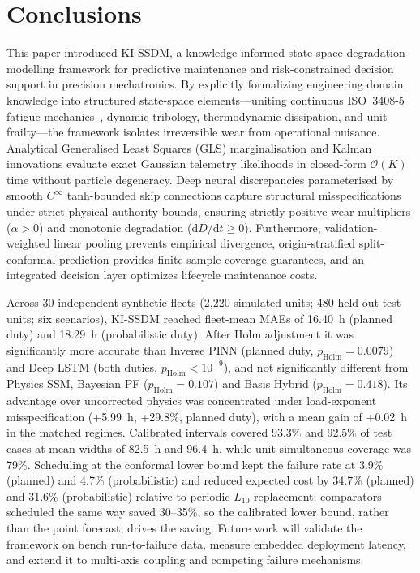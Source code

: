 \documentclass[a4paper,fleqn]{cas-dc}
\begin{document}
\section{Conclusions}
\label{sec:conclusions}

This paper introduced KI-SSDM, a knowledge-informed state-space degradation modelling framework for predictive maintenance and risk-constrained decision support in precision mechatronics. By explicitly formalizing engineering domain knowledge into structured state-space elements---uniting continuous ISO~3408-5 fatigue mechanics~\cite{ISO_3408_5}, dynamic tribology, thermodynamic dissipation, and unit frailty---the framework isolates irreversible wear from operational nuisance. Analytical Generalised Least Squares (GLS) marginalisation and Kalman innovations evaluate exact Gaussian telemetry likelihoods in closed-form $\mathcal{O}(K)$ time without particle degeneracy. Deep neural discrepancies parameterised by smooth $C^\infty$ tanh-bounded skip connections capture structural misspecifications under strict physical authority bounds, ensuring strictly positive wear multipliers ($\alpha > 0$) and monotonic degradation ($\mathrm{d}D/\mathrm{d}t \ge 0$). Furthermore, validation-weighted linear pooling prevents empirical divergence, origin-stratified split-conformal prediction provides finite-sample coverage guarantees, and an integrated decision layer optimizes lifecycle maintenance costs.

Across 30 independent synthetic fleets (2,220 simulated units; 480 held-out test units; six scenarios), KI-SSDM reached fleet-mean MAEs of 16.40~h (planned duty) and 18.29~h (probabilistic duty). After Holm adjustment it was significantly more accurate than Inverse PINN (planned duty, $p_{\mathrm{Holm}} = 0.0079$) and Deep LSTM (both duties, $p_{\mathrm{Holm}} < 10^{-9}$), and not significantly different from Physics SSM, Bayesian PF ($p_{\mathrm{Holm}} = 0.107$) and Basis Hybrid ($p_{\mathrm{Holm}} = 0.418$). Its advantage over uncorrected physics was concentrated under load-exponent misspecification (+5.99~h, +29.8\%, planned duty), with a mean gain of +0.02~h in the matched regimes. Calibrated intervals covered 93.3\% and 92.5\% of test cases at mean widths of 82.5~h and 96.4~h, while unit-simultaneous coverage was 79\%. Scheduling at the conformal lower bound kept the failure rate at 3.9\% (planned) and 4.7\% (probabilistic) and reduced expected cost by 34.7\% (planned) and 31.6\% (probabilistic) relative to periodic $L_{10}$ replacement; comparators scheduled the same way saved 30--35\%, so the calibrated lower bound, rather than the point forecast, drives the saving. Future work will validate the framework on bench run-to-failure data, measure embedded deployment latency, and extend it to multi-axis coupling and competing failure mechanisms.
\end{document}
